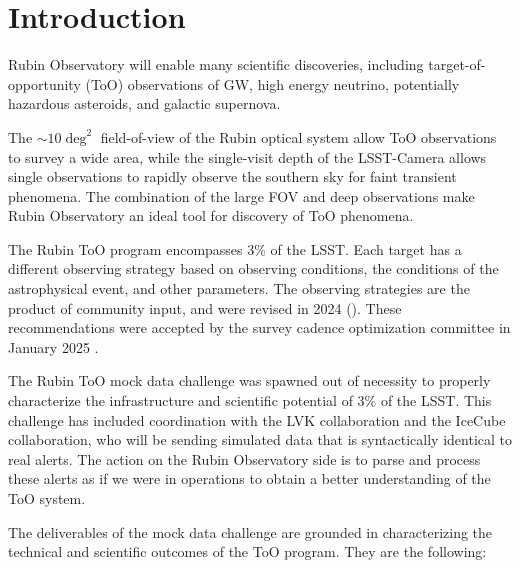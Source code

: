 \section{Introduction}

Rubin Observatory will enable many scientific discoveries, including target-of-opportunity (ToO) observations of GW, high energy neutrino, potentially hazardous asteroids, and galactic supernova. 

The $\sim10\deg^2$ field-of-view of the Rubin optical system allow ToO observations to survey a wide area, while the single-visit depth of the LSST-Camera allows single observations to rapidly observe the southern sky for faint transient phenomena. The combination of the large FOV and deep observations make Rubin Observatory an ideal tool for discovery of ToO phenomena.

The Rubin ToO program encompasses 3\% of the LSST. Each target has a different observing strategy based on observing conditions, the conditions of the astrophysical event, and other parameters. The observing strategies are the product of community input, and were revised in 2024 (\cite{RubinToO2024}). These recommendations were accepted by the survey cadence optimization committee in January 2025 \citep{PSTN-056}.

The Rubin ToO mock data challenge was spawned out of necessity to properly characterize the infrastructure and scientific potential of 3\% of the LSST. This challenge has included coordination with the LVK collaboration and the IceCube collaboration, who will be sending simulated data that is syntactically identical to real alerts. The action on the Rubin Observatory side is to parse and process these alerts as if we were in operations to obtain a better understanding of the ToO system.

The deliverables of the mock data challenge are grounded in characterizing the technical and scientific outcomes of the ToO program. They are the following:

